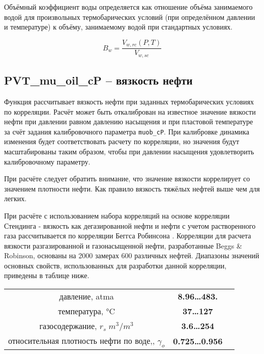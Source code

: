 Объёмный коэффициент воды определяется как отношение объёма занимаемого водой для произвольных термобарических условий (при определённом давлении и температуре) к объёму, занимаемому водой при стандартных условиях. 

$$B_w = \frac{V_{w,rc}(P,T)}{V_{w,sc}}$$


\subsection{PVT\_mu\_oil\_cP – вязкость нефти}
Функция рассчитывает вязкость нефти при заданных термобарических условиях по корреляции. Расчёт может быть откалиброван на известное значение вязкости нефти при давлении равном давлению насыщения и при пластовой температуре за счёт задания калибровочного параметра \texttt{muob_cP}. При калибровке динамика изменения будет соответствовать расчету по корреляции, но значения будут масштабированы таким образом, чтобы при давлении насыщения удовлетворить калибровочному параметру.

При расчёте следует обратить внимание, что значение вязкости коррелирует со значением плотности нефти. Как правило вязкость тяжёлых нефтей выше чем для легких.

При расчёте с использованием набора корреляций на основе корреляции Стендинга - вязкость как дегазированной нефти и нефти с учетом растворенного газа рассчитывается по корреляции Беггса Робинсона \cite{Yukos_PVT_2002}. 
Корреляции для расчета вязкости разгазированной и газонасыщенной нефти, разработанные Beggs \& Robinson, основаны на 2000 замерах 600 различных нефтей.
Диапазоны значений основных свойств, использованных для разработки данной корреляции, приведены в таблице ниже.
\begin{center}
	\begin{tabular}{ccc}
		давление, atma & \textbf{8.96…483.} \\
		температура, °C & \textbf{37…127}  \\
		газосодержание, $r_s \; m^3 /m^3$ & \textbf{3.6…254}\\
		относительная плотность нефти по воде,, $\gamma_o$ & \textbf{0.725…0.956} \\
	\end{tabular}
\end{center}
   

